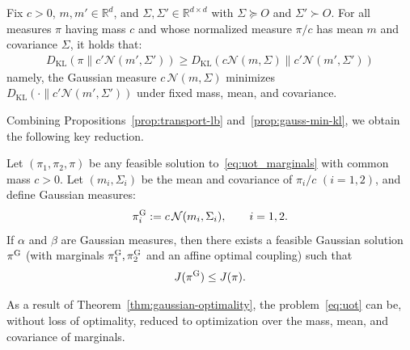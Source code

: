 \documentclass{ifacconf}
\newcommand{\R}{{\mathbb R}}
\newcommand{\Rd}{\R ^{d}}
\newcommand{\calN}{{\mathcal N}}
\newcommand{\KL}[2]{D_{\mathrm{KL}}(#1 \parallel #2)}
\begin{document}
\begin{prop}
\label{prop:gauss-min-kl}
Fix $c>0$, $m,m'\in\Rd$, and $\Sigma,\Sigma'\in\mathbb{R}^{d \times d}$ with $\Sigma \succeq O$ and $\Sigma'\succ O$.
For all measures $\pi$ having mass $c$ and whose normalized measure $\pi/c$ has mean $m$ and covariance $\Sigma$, it holds that:
\begin{align}
    \KL{\pi}{c'\calN(m',\Sigma')}\geq\KL{c\calN(m,\Sigma)}{c'\calN(m',\Sigma')}
\end{align}
namely, the Gaussian measure $c\,\calN(m,\Sigma)$ minimizes  \\
$\KL{\cdot}{c'\calN(m',\Sigma')}$ under fixed mass, mean, and covariance.
\end{prop}

Combining Propositions~\ref{prop:transport-lb} and~\ref{prop:gauss-min-kl}, we obtain the following key reduction.

\begin{thm}
\label{thm:gaussian-optimality}
Let $(\pi_1,\pi_2,\pi)$ be any feasible solution to~\eqref{eq:uot_marginals} with common mass $c>0$.
Let $(m_i,\Sigma_i)$ be the mean and covariance of $\pi_i/c$ $(i=1,2)$, and define Gaussian measures:
\begin{align}
    \pi_i^{\rm G} := c\,\calN(m_i,\Sigma_i), \qquad i=1,2.
\end{align}
If $\alpha$ and $\beta$ are Gaussian measures, then there exists a feasible Gaussian solution $\pi^{\rm G}$
(with marginals $\pi_1^{\rm G},\pi_2^{\rm G}$ and an affine optimal coupling) such that
\begin{align}
    J(\pi^{\rm G}) \le J(\pi).
\end{align}
\end{thm}
As a result of Theorem~\ref{thm:gaussian-optimality}, the problem~\eqref{eq:uot} can be, without loss of optimality, reduced to optimization over the mass, mean, and covariance of marginals.
\end{document}
